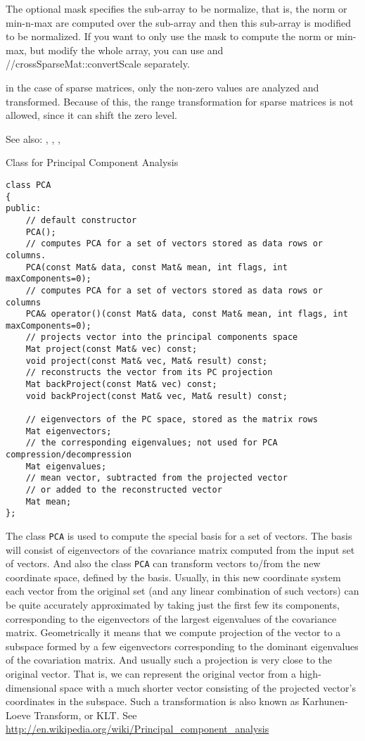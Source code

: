 The optional mask specifies the sub-array to be normalize, that is, the norm or min-n-max are computed over the sub-array and then this sub-array is modified to be normalized. If you want to only use the mask to compute the norm or min-max, but modify the whole array, you can use  and //cross{SparseMat::convertScale} separately.

in the case of sparse matrices, only the non-zero values are analyzed and transformed. Because of this, the range transformation for sparse matrices is not allowed, since it can shift the zero level. 

See also: , , , 


Class for Principal Component Analysis

\begin{lstlisting}
class PCA
{
public:
    // default constructor
    PCA();
    // computes PCA for a set of vectors stored as data rows or columns.
    PCA(const Mat& data, const Mat& mean, int flags, int maxComponents=0);
    // computes PCA for a set of vectors stored as data rows or columns
    PCA& operator()(const Mat& data, const Mat& mean, int flags, int maxComponents=0);
    // projects vector into the principal components space
    Mat project(const Mat& vec) const;
    void project(const Mat& vec, Mat& result) const;
    // reconstructs the vector from its PC projection
    Mat backProject(const Mat& vec) const;
    void backProject(const Mat& vec, Mat& result) const;

    // eigenvectors of the PC space, stored as the matrix rows
    Mat eigenvectors;
    // the corresponding eigenvalues; not used for PCA compression/decompression
    Mat eigenvalues;
    // mean vector, subtracted from the projected vector
    // or added to the reconstructed vector
    Mat mean;
};
\end{lstlisting}

The class \texttt{PCA} is used to compute the special basis for a set of vectors. The basis will consist of eigenvectors of the covariance matrix computed from the input set of vectors. And also the class \texttt{PCA} can transform vectors to/from the new coordinate space, defined by the basis. Usually, in this new coordinate system each vector from the original set (and any linear combination of such vectors) can be quite accurately approximated by taking just the first few its components, corresponding to the eigenvectors of the largest eigenvalues of the covariance matrix. Geometrically it means that we compute projection of the vector to a subspace formed by a few eigenvectors corresponding to the dominant eigenvalues of the covariation matrix. And usually such a projection is very close to the original vector. That is, we can represent the original vector from a high-dimensional space with a much shorter vector consisting of the projected vector's coordinates in the subspace. Such a transformation is also known as Karhunen-Loeve Transform, or KLT. See \url{http://en.wikipedia.org/wiki/Principal\_component\_analysis}

